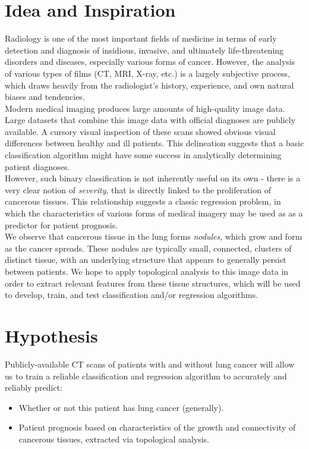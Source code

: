 \documentclass[12pt]{report}
\begin{document}
\section{Idea and Inspiration}
\indent Radiology is one of the most important fields of medicine in terms of early detection and diagnosis of insidious, invasive, and ultimately life-threatening disorders and diseases, especially various forms of cancer. However, the analysis of various types of films (CT, MRI, X-ray, etc.) is a largely subjective process, which draws heavily from the radiologist's history, experience, and own natural biases and tendencies. \\
\indent Modern medical imaging produces large amounts of high-quality image data. Large datasets that combine this image data with official diagnoses are publicly available. A cursory visual inspection of these scans showed obvious visual differences between healthy and ill patients. This delineation suggests that a basic classification algorithm might have some success in analytically determining patient diagnoses. \\
\indent However, such binary classification is not inherently useful on its own - there is a very clear notion of \textit{severity}, that is directly linked to the proliferation of cancerous tissues. This relationship suggests a classic regression problem, in which the characteristics of various forms of medical imagery may be used as as a predictor for patient prognosis.\\
\indent We observe that cancerous tissue in the lung forms \textit{nodules}, which grow and form as the cancer spreads. These nodules are typically small, connected, clusters of distinct tissue, with an underlying structure that appears to generally persist between patients. We hope to apply topological analysis to this image data in order to extract relevant features from these tissue structures, which will be used to develop, train, and test classification and/or regression algorithms.

\section{Hypothesis}
Publicly-available CT scans of patients with and without lung cancer will allow us to train a reliable classification and regression algorithm to accurately and reliably predict:
\begin{itemize}
\item Whether or not this patient has lung cancer (generally).
\item Patient prognosis based on characteristics of the growth and connectivity of cancerous tissues, extracted via topological analysis.
\end{itemize}
\end{document}
